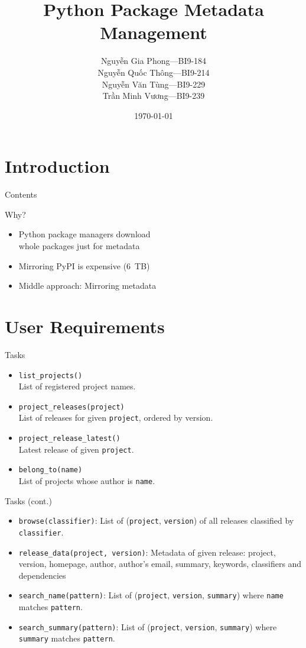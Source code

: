 \documentclass[pdf]{beamer}
\title{Python Package Metadata Management}
\author[Group 8]{Nguyễn Gia Phong---BI9-184\\
                 Nguyễn Quốc Thông---BI9-214\\
                 Nguyễn Văn Tùng---BI9-229\\
                 Trần Minh Vương---BI9-239}
\institute{University of Science and Technology of Hà Nội}
\date{\selectlanguage{english}\today}
\newcommand{\byte}{B}
\begin{document}
\frame{\titlepage}

\section{Introduction}
\begin{frame}{Contents}
  \tableofcontents
\end{frame}

\begin{frame}{Why?}\Large
  \begin{itemize}
    \item Python package managers download\\
      whole packages just for metadata
    \item Mirroring PyPI is expensive (\SI{6}{\tera\byte})
    \item Middle approach: Mirroring metadata
  \end{itemize}
\end{frame}

\section{User Requirements}
\frame{\tableofcontents[currentsection]}
\begin{frame}[fragile]{Tasks}
  \begin{itemize}
    \item \verb|list_projects()|\\
      List of registered project names.
    \item \verb|project_releases(project)|\\
      List of releases for given \verb|project|, ordered by version.
    \item \verb|project_release_latest()|\\
      Latest release of given \verb|project|.
    \item \verb|belong_to(name)|\\
      List of projects whose author is \verb|name|.
  \end{itemize}
\end{frame}

\begin{frame}[fragile]{Tasks (cont.)}
  \begin{itemize}
    \item \verb|browse(classifier)|: List of (\verb|project|,
      \verb|version|) of all releases classified by \verb|classifier|.
    \item \verb|release_data(project, version)|: Metadata of given release:
      project, version, homepage, author, author's email, summary, keywords,
      classifiers and dependencies
    \item \verb|search_name(pattern)|: List of (\verb|project|,
      \verb|version|, \verb|summary|) where \verb|name| matches \verb|pattern|.
    \item \verb|search_summary(pattern)|: List of (\verb|project|,
      \verb|version|, \verb|summary|) where \verb|summary| matches \verb|pattern|.
  \end{itemize}
\end{frame}
\end{document}
